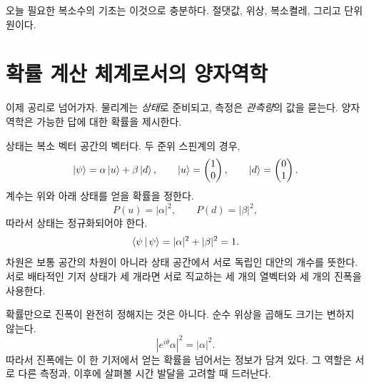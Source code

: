 \begin{classroomqa}\end{classroomqa}

오늘 필요한 복소수의 기초는 이것으로 충분하다. 절댓값, 위상, 복소켤레, 그리고 단위원이다.

\section{확률 계산 체계로서의 양자역학}

이제 공리로 넘어가자. 물리계는 \emph{상태}로 준비되고, 측정은 \emph{관측량}의 값을 묻는다. 양자역학은 가능한 답에 대한 확률을 제시한다.

상태는 복소 벡터 공간의 벡터다. 두 준위 스핀계의 경우, \begin{equation}
  \left\lvert\psi\right\rangle=\alpha\left\lvert u\right\rangle+\beta\left\lvert d\right\rangle,
  \qquad
  \left\lvert u\right\rangle=\begin{pmatrix}1\\0\end{pmatrix},
  \qquad
  \left\lvert d\right\rangle=\begin{pmatrix}0\\1\end{pmatrix}.
  \label{eq:l03-two-level-state}
\end{equation}계수는 위와 아래 상태를 얻을 확률을 정한다. \begin{equation}
  P(u)=|\alpha|^2,
  \qquad
  P(d)=|\beta|^2,
\end{equation}따라서 상태는 정규화되어야 한다. \begin{equation}
  \left\langle\psi\,\middle|\,\psi\right\rangle
  =|\alpha|^2+|\beta|^2
  =1.
  \label{eq:l03-state-normalization}
\end{equation}차원은 보통 공간의 차원이 아니라 상태 공간에서 서로 독립인 대안의 개수를 뜻한다. 서로 배타적인 기저 상태가 세 개라면 서로 직교하는 세 개의 열벡터와 세 개의 진폭을 사용한다.

확률만으로 진폭이 완전히 정해지는 것은 아니다. 순수 위상을 곱해도 크기는 변하지 않는다. \begin{equation}
  |e^{i\theta}\alpha|^2=|\alpha|^2.
\end{equation}따라서 진폭에는 이 한 기저에서 얻는 확률을 넘어서는 정보가 담겨 있다. 그 역할은 서로 다른 측정과, 이후에 살펴볼 시간 발달을 고려할 때 드러난다.

